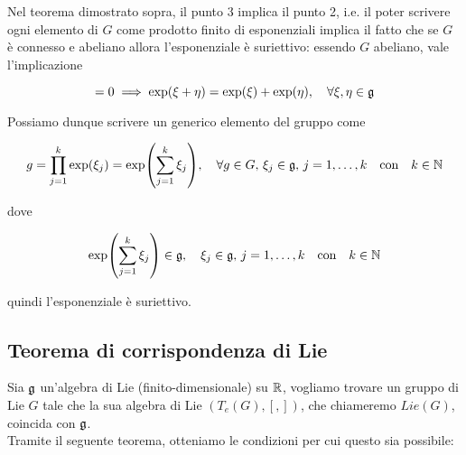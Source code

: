 \begin{remark}
	Nel teorema dimostrato sopra, il punto 3 implica il punto 2, i.e. il poter scrivere ogni elemento di $ G $ come prodotto finito di esponenziali implica il fatto che se $ G $ è connesso e abeliano allora l'esponenziale è suriettivo: essendo $ G $ abeliano, vale l'implicazione
	
	\begin{equation}
		[\xi,\eta] = 0 \implies \exp(\xi + \eta) = \exp(\xi) + \exp(\eta) %
		\qcomma \forall \xi,\eta \in \g
	\end{equation}

	Possiamo dunque scrivere un generico elemento del gruppo come
	
	\begin{equation}
		g = \prod_{j=1}^{k} \exp(\xi_{j}) = \exp( \sum_{j=1}^{k} \xi_{j} ) %
		\qcomma \forall g \in G, \, \xi_{j} \in \g, \, j=1,\dots,k \qq{con} k \in \N
	\end{equation}

	dove
	
	\begin{equation}
		\exp( \sum_{j=1}^{k} \xi_{j} ) \in \g %
		\qcomma \xi_{j} \in \g, \, j=1,\dots,k \qq{con} k \in \N
	\end{equation}
	
	quindi l'esponenziale è suriettivo.
\end{remark}

\subsection{Teorema di corrispondenza di Lie}

Sia $ \mathfrak{g} $ un'algebra di Lie (finito-dimensionale) su $ \mathbb{R} $, vogliamo trovare un gruppo di Lie $ G $ tale che la sua algebra di Lie $ (T_{e}(G),[,]) $, che chiameremo $ Lie(G) $, coincida con $ \mathfrak{g} $.\\
Tramite il seguente teorema, otteniamo le condizioni per cui questo sia possibile:

